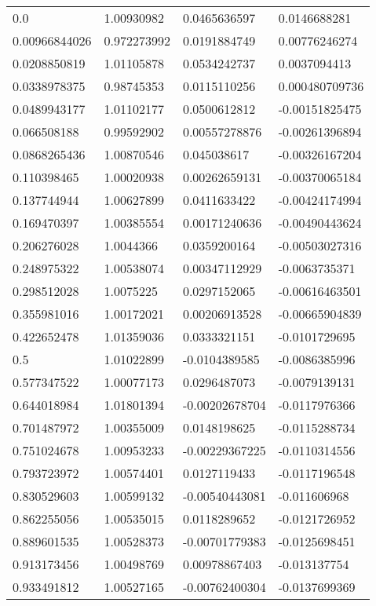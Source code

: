 \begin{longtable}{llll}
	0.0 & 1.00930982 & 0.0465636597 & 0.0146688281 \\ 
	0.00966844026 & 0.972273992 & 0.0191884749 & 0.00776246274 \\ 
	0.0208850819 & 1.01105878 & 0.0534242737 & 0.0037094413 \\ 
	0.0338978375 & 0.98745353 & 0.0115110256 & 0.000480709736 \\ 
	0.0489943177 & 1.01102177 & 0.0500612812 & -0.00151825475 \\ 
	0.066508188 & 0.99592902 & 0.00557278876 & -0.00261396894 \\ 
	0.0868265436 & 1.00870546 & 0.045038617 & -0.00326167204 \\ 
	0.110398465 & 1.00020938 & 0.00262659131 & -0.00370065184 \\ 
	0.137744944 & 1.00627899 & 0.0411633422 & -0.00424174994 \\ 
	0.169470397 & 1.00385554 & 0.00171240636 & -0.00490443624 \\ 
	0.206276028 & 1.0044366 & 0.0359200164 & -0.00503027316 \\ 
	0.248975322 & 1.00538074 & 0.00347112929 & -0.0063735371 \\ 
	0.298512028 & 1.0075225 & 0.0297152065 & -0.00616463501 \\ 
	0.355981016 & 1.00172021 & 0.00206913528 & -0.00665904839 \\ 
	0.422652478 & 1.01359036 & 0.0333321151 & -0.0101729695 \\ 
	0.5 & 1.01022899 & -0.0104389585 & -0.0086385996 \\ 
	0.577347522 & 1.00077173 & 0.0296487073 & -0.0079139131 \\ 
	0.644018984 & 1.01801394 & -0.00202678704 & -0.0117976366 \\ 
	0.701487972 & 1.00355009 & 0.0148198625 & -0.0115288734 \\ 
	0.751024678 & 1.00953233 & -0.00229367225 & -0.0110314556 \\ 
	0.793723972 & 1.00574401 & 0.0127119433 & -0.0117196548 \\ 
	0.830529603 & 1.00599132 & -0.00540443081 & -0.011606968 \\ 
	0.862255056 & 1.00535015 & 0.0118289652 & -0.0121726952 \\ 
	0.889601535 & 1.00528373 & -0.00701779383 & -0.0125698451 \\ 
	0.913173456 & 1.00498769 & 0.00978867403 & -0.013137754 \\ 
	0.933491812 & 1.00527165 & -0.00762400304 & -0.0137699369 \\ 

\end{longtable}
